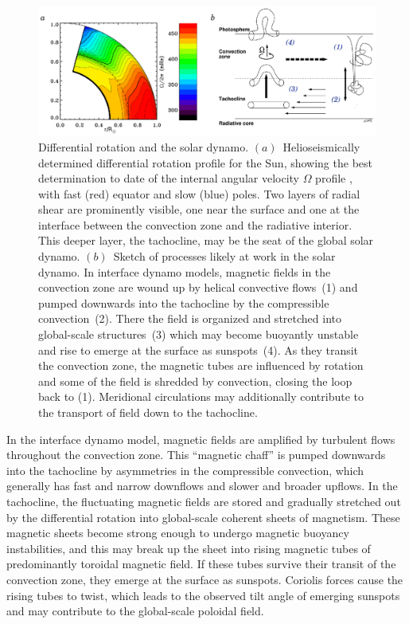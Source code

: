 \begin{figure}[!t]
  \begin{center}
    \includegraphics{figs/chapter_1/solar_DR_and_nics_sketch.eps}
  \end{center}
  \caption[Differential rotation and the solar dynamo]
	  {Differential rotation and the solar dynamo.  
     $(a)$~Helioseismically determined differential rotation profile
	  for the Sun, showing the best determination to date of the
	  internal angular velocity $\Omega$ profile \citep{Thompson_2009},
	  with fast (red) equator and slow (blue) poles.
	  Two layers of radial shear are prominently
	  visible, one near the surface and one at the interface
	  between the convection zone and the radiative interior.
	  This deeper layer, the tachocline, may be the seat
	  of the global solar dynamo.
     $(b)$~Sketch of processes likely at work in the solar dynamo.
	  In interface dynamo models, magnetic fields in the convection zone
	  are wound up by helical convective flows~(1) and pumped downwards
	  into the tachocline by the compressible convection~(2).
	  There the field is organized and stretched into global-scale
	  structures~(3) which may become buoyantly unstable
	  and rise to emerge at the surface as sunspots~(4).  As they
	  transit the convection zone, the magnetic tubes are
	  influenced by rotation and some of the field is shredded by
	  convection, closing the loop back to (1).  Meridional
	  circulations may additionally contribute to the transport of
	  field down to the tachocline.
          \label{fig:solar DR and Brummell diagram}}
          \vskip-0.5cm
\end{figure}

In the interface dynamo model, magnetic fields are amplified by
turbulent flows throughout the convection zone.  This ``magnetic
chaff'' is pumped downwards into the tachocline by asymmetries in the
compressible convection, which generally has fast and narrow downflows
and slower and broader upflows.  In the tachocline, the fluctuating
magnetic fields are stored and gradually stretched out by the
differential rotation into
global-scale coherent sheets of magnetism.  These magnetic sheets
become strong enough to undergo magnetic buoyancy instabilities, and
this may break up the sheet into rising magnetic tubes of
predominantly toroidal magnetic field.  If these
tubes survive their transit of the convection zone, they emerge at the
surface as sunspots.  Coriolis forces cause the rising tubes to twist,
which leads to the observed tilt angle of emerging sunspots and may
contribute to the global-scale poloidal field.  

